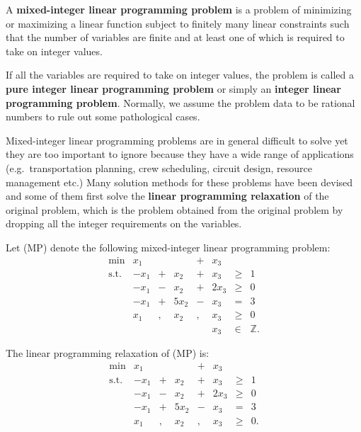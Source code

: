 A \textbf{mixed-integer linear programming problem} is a problem of
minimizing or maximizing a linear function subject to finitely many
linear constraints such that the number of variables are finite and at
least one of which is required to take on integer values.

If all the variables are required to take on integer values, the problem
is called a \textbf{pure integer linear programming problem} or simply
an \textbf{integer linear programming problem}. Normally, we assume the
problem data to be rational numbers to rule out some pathological cases.

Mixed-integer linear programming problems are in general difficult to
solve yet they are too important to ignore because they have a wide
range of applications (e.g.~transportation planning, crew scheduling,
circuit design, resource management etc.) Many solution methods for
these problems have been devised and some of them first solve the
\textbf{linear programming relaxation} of the original problem, which is
the problem obtained from the original problem by dropping all the
integer requirements on the variables.

\begin{example}{}{}
\protect\hypertarget{ex:ilp-ex}{}{\label{ex:ilp-ex}} Let (MP) denote the
following mixed-integer linear programming problem:
\[\begin{array}{rrcrcrlll}
\mbox{min} & x_1 &  &  & + & x_3  \\
\text{s.t.} & -x_1 & + &  x_2 & + &  x_3  & \geq & 1 \\
& -x_1 & - &  x_2 & + & 2x_3  & \geq & 0 \\
& -x_1 & + & 5x_2 & - &  x_3  & = & 3 \\
&  x_1 & , & x_2 & , & x_3 & \geq & 0 \\
&      &   &     &   & x_3  & \in & \mathbb{Z}. 
\end{array}\]

The linear programming relaxation of (MP) is: \[\begin{array}{rrcrcrlll}
\mbox{min} & x_1 &  &  & + & x_3  \\
\text{s.t.} & -x_1 & + &  x_2 & + &  x_3  & \geq & 1 \\
& -x_1 & - &  x_2 & + & 2x_3  & \geq & 0 \\
& -x_1 & + & 5x_2 & - &  x_3  & = & 3 \\
&  x_1 & , & x_2 & , & x_3 & \geq & 0.
\end{array}\]
\end{example}

